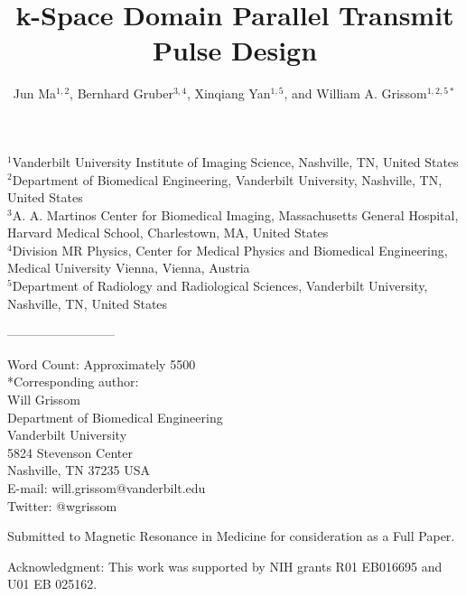 \documentclass[11pt]{article}
\begin{document}
\title{k-Space Domain Parallel Transmit Pulse Design}
\author{Jun Ma$^{1,2}$, Bernhard Gruber$^{3,4}$, Xinqiang Yan$^{1,5}$, and William A. Grissom$^{1,2,5*}$}
\maketitle
\begin{flushleft}
\vspace{-0.5cm}
$^1$Vanderbilt University Institute of Imaging Science, Nashville, TN, United States\\
$^2$Department of Biomedical Engineering, Vanderbilt University, Nashville, TN, United States\\
$^3$A. A. Martinos Center for Biomedical Imaging, Massachusetts General Hospital, Harvard Medical School, Charlestown, MA, United States\\
$^4$Division MR Physics, Center for Medical Physics and Biomedical Engineering, Medical University Vienna, Vienna, Austria\\
$^5$Department of Radiology and Radiological Sciences, Vanderbilt University, Nashville, TN, United States\\    

\par
-------------------------- 

\par
Word Count: Approximately 5500 \\
*Corresponding author: \\
Will Grissom\\
Department of Biomedical Engineering\\
Vanderbilt University\\
5824 Stevenson Center\\
Nashville, TN 37235 USA \\
E-mail: will.grissom@vanderbilt.edu \\
Twitter: @wgrissom

\par Submitted to Magnetic Resonance in Medicine for consideration as a Full Paper.

\par
Acknowledgment: This work was supported by NIH grants R01 EB016695 and U01 EB 025162.

\end{flushleft}
\thispagestyle{plain}

\pagebreak

\end{document}
